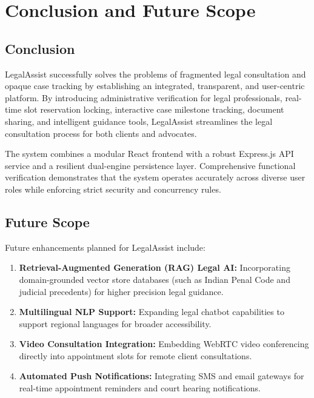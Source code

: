 \documentclass[12pt,a4paper]{report}
\begin{document}
\chapter{Conclusion and Future Scope}

\section{Conclusion}
LegalAssist successfully solves the problems of fragmented legal consultation and opaque case tracking by establishing an integrated, transparent, and user-centric platform. By introducing administrative verification for legal professionals, real-time slot reservation locking, interactive case milestone tracking, document sharing, and intelligent guidance tools, LegalAssist streamlines the legal consultation process for both clients and advocates.

The system combines a modular React frontend with a robust Express.js API service and a resilient dual-engine persistence layer. Comprehensive functional verification demonstrates that the system operates accurately across diverse user roles while enforcing strict security and concurrency rules.

\section{Future Scope}
Future enhancements planned for LegalAssist include:
\begin{enumerate}
    \item \textbf{Retrieval-Augmented Generation (RAG) Legal AI:} Incorporating domain-grounded vector store databases (such as Indian Penal Code and judicial precedents) for higher precision legal guidance.
    \item \textbf{Multilingual NLP Support:} Expanding legal chatbot capabilities to support regional languages for broader accessibility.
    \item \textbf{Video Consultation Integration:} Embedding WebRTC video conferencing directly into appointment slots for remote client consultations.
    \item \textbf{Automated Push Notifications:} Integrating SMS and email gateways for real-time appointment reminders and court hearing notifications.
\end{enumerate}
\end{document}
